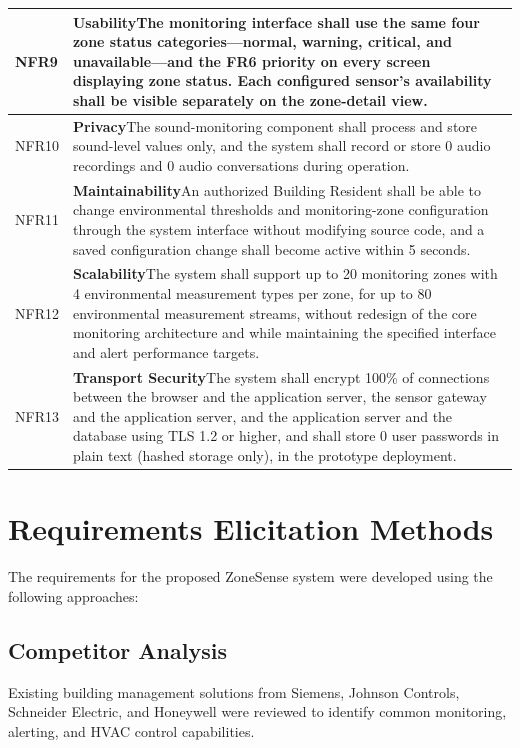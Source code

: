\documentclass[11pt,a4paper]{article}
\newcommand{\nfr}[2]{\textbf{#1}\newline #2}
\begin{document}
{\begin{xltabular}{\linewidth}{|B{1.3cm}|Y|}
NFR9 & \nfr{Usability}{The monitoring interface shall use the same four zone status categories---normal, warning, critical, and unavailable---and the FR6 priority on every screen displaying zone status. Each configured sensor's availability shall be visible separately on the zone-detail view.}\\\hline
NFR10 & \nfr{Privacy}{The sound-monitoring component shall process and store sound-level values only, and the system shall record or store 0 audio recordings and 0 audio conversations during operation.}\\\hline
NFR11 & \nfr{Maintainability}{An authorized Building Resident shall be able to change environmental thresholds and monitoring-zone configuration through the system interface without modifying source code, and a saved configuration change shall become active within 5 seconds.}\\\hline
NFR12 & \nfr{Scalability}{The system shall support up to 20 monitoring zones with 4 environmental measurement types per zone, for up to 80 environmental measurement streams, without redesign of the core monitoring architecture and while maintaining the specified interface and alert performance targets.}\\\hline
NFR13 & \nfr{Transport Security}{The system shall encrypt 100\% of connections between the browser and the application server, the sensor gateway and the application server, and the application server and the database using TLS 1.2 or higher, and shall store 0 user passwords in plain text (hashed storage only), in the prototype deployment.}\\\hline
\end{xltabular}}

\clearpage
\section{Requirements Elicitation Methods}
The requirements for the proposed ZoneSense system were developed using the following approaches:

\subsection{Competitor Analysis}
Existing building management solutions from Siemens, Johnson Controls, Schneider Electric, and Honeywell were reviewed to identify common monitoring, alerting, and HVAC control capabilities.
\end{document}
